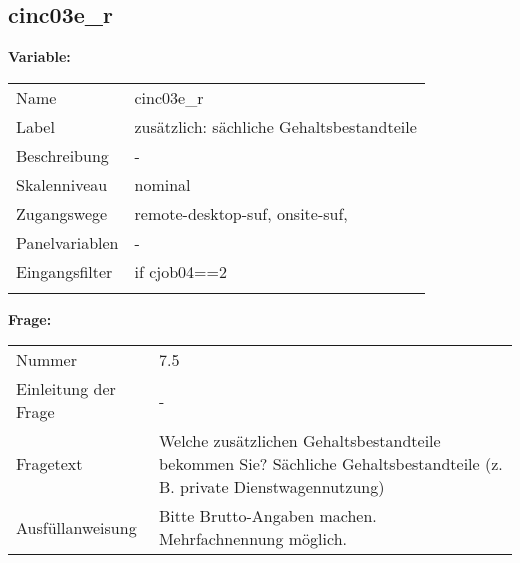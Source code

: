 	
	
	\subsection{cinc03e\_r}
	\label{subSection:cinc03e_r}

	\noindent\textbf{Variable:}\\
		\begin{tabular}{lL{11.3cm}}
			\label{tableVariable:cinc03e_r}
			Name & cinc03e\_r \\
			Label & zusätzlich: sächliche Gehaltsbestandteile \\
			Beschreibung & - \\
			Skalenniveau & nominal \\
			Zugangswege &
				remote-desktop-suf,
				onsite-suf,
 \\
			Panelvariablen & -
			 \\
			Eingangsfilter & if cjob04==2 \\
 \\
		\end{tabular}

		\vspace*{1 cm}
		\noindent\textbf{Frage:}\\
		\begin{tabular}{lL{11.3cm}}
			\label{tableQuestion:cinc03e_r}
			Nummer & 7.5 \\
			Einleitung der Frage & - \\
			Fragetext & Welche zusätzlichen Gehaltsbestandteile bekommen Sie?
Sächliche Gehaltsbestandteile
(z. B. private Dienstwagennutzung) \\
			Ausfüllanweisung & 
Bitte Brutto-Angaben machen. Mehrfachnennung möglich. \\
		\end{tabular}






